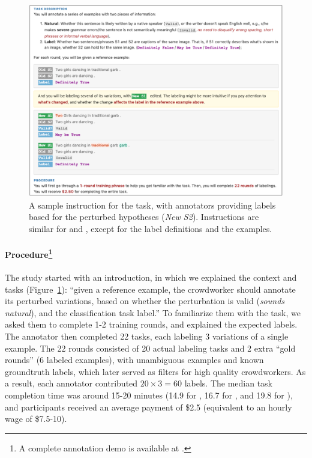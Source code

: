 \begin{figure}
\centering

\includegraphics[width=1\textwidth]{figures/mturk_instruction.pdf}
\vspace{-15pt}
\caption{A sample instruction for the \nli task, with annotators providing labels based for the perturbed hypotheses (\emph{New S2}). Instructions are similar for \qqp and \sst, except for the label definitions and the examples. }
\vspace{-10pt}
\label{fig:mturk_instruction_detail}

\end{figure}

\paragraph{Procedure\footnote{A complete annotation demo is available at \mturkurl.}}
The study started with an introduction, in which we explained the context and tasks (Figure~\ref{fig:mturk_instruction_detail}): 
``given a reference example, the crowdworker should annotate its perturbed variations, based on whether the perturbation is valid (\emph{sounds natural}), and the classification task label.''
To familiarize them with the task, we asked them to complete 1-2 training rounds, and explained the expected labels.
The annotator then completed 22 tasks, each labeling 3 variations of a single example.
The 22 rounds consisted of 20 actual labeling tasks and 2 extra ``gold rounds'' (6 labeled examples), with unambiguous examples and known groundtruth labels, which later served as filters for high quality crowdworkers.
As a result, each annotator contributed $20 \times 3=60$ labels.
The median task completion time was around 15-20 minutes (14.9 for \qqp, 16.7 for \sst, and 19.8 for \nli), and participants received an average payment of \$2.5 (equivalent to an hourly wage of \$7.5-10).

